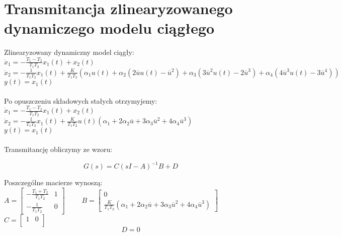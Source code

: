 \documentclass[a4paper, 11pt]{article}
\begin{document}
\section{Transmitancja zlinearyzowanego dynamiczego modelu ciągłego}
Zlinearyzowany dynamiczny model ciągły: 
\\

$\dot{x}_1 = -\frac{T_{1}-T_{2}}{T_{1}T_{2}}x_{1}(t) +x_{2}(t)$
\\

$\dot{x}_2 = -\frac{1}{T_{1}T_{2}}x_{1}(t) + \frac{K}{T_{1}T_{2}}(\alpha_1u(t)+\alpha_2(2\overline{u}u(t) - \overline{u}^2)+ \alpha_3(3\overline{u}^2u(t)-2\overline{u}^3) + \alpha_4(4\overline{u}^3u(t) - 3\overline{u}^4))$
\\

$y(t) = x_{1}(t)$
\\
\\

Po opuszczeniu składowych stałych otrzymyjemy: 
\\

$\dot{x}_1 = -\frac{T_{1}-T_{2}}{T_{1}T_{2}}x_{1}(t) +x_{2}(t)$
\\

$\dot{x}_2 = -\frac{1}{T_{1}T_{2}}x_{1}(t) + \frac{K}{T_{1}T_{2}}u(t)(\alpha_1+2\alpha_2\overline{u}+3\alpha_3\overline{u}^2+4\alpha_4\overline{u}^3)$
\\

$y(t) = x_{1}(t)$
\\
\\

\noindent Transmitancję obliczymy ze wzoru: 

$$G(s) = C(sI-A)^{-1}B + D$$

\noindent Poszczególne macierze wynoszą: \\

$ A= \left[
        \begin{array}{cc}
         -\frac{T_1+T_2}{T_1T_2} & 1\\
         -\frac{1}{T_1T_2} & 0
         \end{array}
      \right]
      \qquad $
$ B= \left[
        \begin{array}{c}
         0\\
         \frac{K}{T_{1}T_{2}}(\alpha_1+2\alpha_2\overline{u}+3\alpha_3\overline{u}^2+4\alpha_4\overline{u}^3)
         \end{array}
      \right]
      \qquad $
$ C= \left[
        \begin{array}{cc}
         1& 0\\
         \end{array}
      \right]
      \qquad $
$$D=0$$
\end{document}
